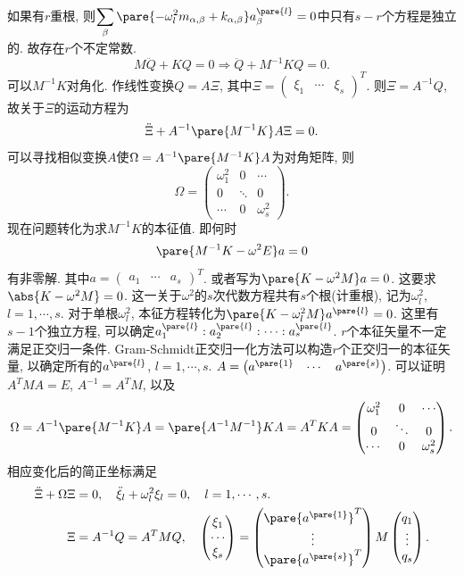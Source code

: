 \documentclass{ctexart}
\begin{document}
如果有$r$重根, 则$\displaystyle \sum_\beta \pare{-\omega_l^2 m_{\alpha,\beta}+k_{\alpha,\beta}} a_\beta^{\pare{l}} = 0$中只有$s-r$个方程是独立的. 故存在$r$个不定常数.
\[ M\ddot{Q} + KQ = 0 \Rightarrow \ddot{Q} + M^{-1}KQ = 0. \]
可以$M^{-1}K$对角化. 作线性变换$Q = A\Xi$, 其中$\Xi = \begin{pmatrix}
    \xi_1 & \cdots & \xi_s
\end{pmatrix}^T$. 则$\Xi = A^{-1}Q$, 故关于$\Xi$的运动方程为
\[ \ddot{\Xi} + A^{-1}\pare{M^{-1}K} A\Xi = 0. \]
可以寻找相似变换$A$使$\Omega = A^{-1}\pare{M^{-1}K}A$为对角矩阵, 则
\[ \Omega = \begin{pmatrix}
    \omega_1^2 & 0 & \cdots \\
    0 & \ddots & 0 \\
    \cdots & 0 & \omega_s^2
\end{pmatrix}. \]
现在问题转化为求$M^{-1}K$的本征值. 即何时
\[ \pare{M^{-1}K - \omega^2 E}a = 0 \]
有非零解. 其中$a = \begin{pmatrix}
    a_1 & \cdots & a_s
\end{pmatrix}^T$. 或者写为$\pare{K - \omega^2 M} a = 0$. 这要求$\abs{K - \omega^2 M} = 0$. 这一关于$\omega^2$的$s$次代数方程共有$s$个根(计重根), 记为$\omega_l^2$, $l=1,\cdots,s$. 对于单根$\omega_l^2$, 本征方程转化为$\pare{K-\omega_l^2 M}a^{\pare{l}} = 0$. 这里有$s-1$个独立方程, 可以确定$a_1^{\pare{l}} : a_2^{\pare{l}}:\cdots : a_s^{\pare{l}}$. $r$个本征矢量不一定满足正交归一条件. Gram-Schmidt正交归一化方法可以构造$r$个正交归一的本征矢量, 以确定所有的$a^{\pare{l}}$, $l=1,\cdots,s$. $A = \begin{pmatrix}
    a^{\pare{1}} & \cdots & a^{\pare{s}}
\end{pmatrix}$. 可以证明$A^TMA = E$, $A^{-1} = A^T M$, 以及
\[ \Omega = A^{-1}\pare{M^{-1}K} A = \pare{A^{-1}M^{-1}}KA = A^TKA = \begin{pmatrix}
    \omega_1^2 & 0 & \cdots \\
    0 & \ddots & 0 \\
    \cdots & 0 & \omega_s^2
\end{pmatrix}. \]
相应变化后的简正坐标满足
\begin{align*}
    \ddot{\Xi} + \Omega \Xi &= 0,\quad \ddot{\xi}_l + \omega_l^2 \xi_l = 0,\quad l = 1,\cdots, s. \\
    \Xi &= A^{-1}Q = A^TMQ,\quad \begin{pmatrix}
        \xi_1 \\ \cdots \\ \xi_s
    \end{pmatrix} = \begin{pmatrix}
        \pare{a^{\pare{1}}}^T \\ \vdots \\ \pare{a^{\pare{s}}}^T
    \end{pmatrix} M \begin{pmatrix}
        q_1 \\ \vdots \\ q_s
    \end{pmatrix}.
\end{align*}
\end{document}
